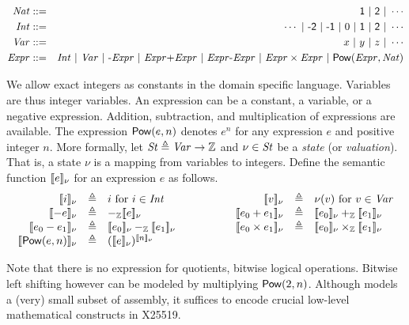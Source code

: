 \begin{eqnarray*}
  \Nat & ::= & \dslcode{1}\ |\ \dslcode{2}\ |\ \cdots\\
  \Int & ::= & \cdots \ |\ \dslcode{-2}\ |\ \dslcode{-1} \ |\ 0\ |\ 
            \dslcode{1}\ |\ \dslcode{2}\ |\ \cdots\\
  \Var & ::= & {x} \ |\ {y} \ |\ {z} \ |\ \cdots\\
  \Expr & ::= &  \Int \ |\ \Var \ |\  \dslcode{-}\Expr \ |\ 
                 \Expr \dslcode{+} \Expr \ |\ \Expr \dslcode{-} \Expr \ |\ 
                 \Expr \times \Expr \ |\ \dslcode{Pow} (\Expr, \Nat)
\end{eqnarray*}

We allow exact integers as constants in the domain specific
language. Variables are thus integer variables. An expression can be a
constant, a variable, or a negative expression. Addition, subtraction,
and multiplication of expressions are available. The expression
$\mbox{\textsf{Pow}}(e, n)$ denotes $e^n$ for any expression $e$ and positive
integer $n$. More formally, let $\mathit{St} \triangleq \mathit{Var} \rightarrow
\mathbb{Z}$ and $\nu \in \mathit{St}$ be a \emph{state} (or \emph{valuation}). That is,
a {state} $\nu$ is a mapping from variables to integers. Define the
semantic function $[\![{e}]\!]_{\nu}$ for an expression $e$ as follows.
\[
\begin{array}{rclcrcl}
  \valueof{{i}}_{\nu} & \defn & i \textmd{  for ${i} \in \Int$} 
  & \hspace{.1\textwidth} &
  \valueof{{v}}_{\nu} & \defn & \nu({v}) 
     \textmd{  for ${v} \in \Var$}\\
  \valueof{-e}_{\nu} & \defn & -_{\bbfZ}\valueof{e}_{\nu}
  &&
  \valueof{e_0 + e_1}_{\nu} & \defn & 
     \valueof{e_0}_{\nu} +_{\bbfZ} \valueof{e_1}_{\nu} \\
  \valueof{e_0 - e_1}_{\nu} & \defn & 
     \valueof{e_0}_{\nu} -_{\bbfZ} \valueof{e_1}_{\nu}
  &&
  \valueof{e_0 \times e_1}_{\nu} & \defn & 
     \valueof{e_0}_{\nu} \times_{\bbfZ} \valueof{e_1}_{\nu} \\
  \valueof{\dslcode{Pow}(e, n)}_{\nu} & \defn & 
     (\valueof{e}_{\nu})^{\valueof{n}_{\nu}}
\end{array}
\]

Note that there is no expression for quotients, bitwise logical
operations. Bitwise left shifting however can be modeled by
multiplying $\mbox{\textsf{Pow}}(2, n)$. Although \mydsl models a (very) 
small subset of assembly, it suffices to encode crucial low-level
mathematical constructs in X25519.

